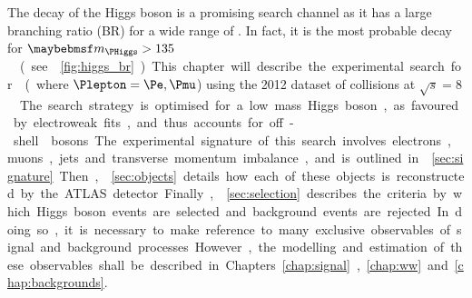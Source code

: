 
The \WW decay of the Higgs boson is a promising search channel as it has a large branching 
ratio (BR) for a wide range of \mH. In fact, it is the most probable decay for 
\unit{$\mH > 135$}{\GeV} (see \Figure~\ref{fig:higgs_br}). This chapter will describe the 
experimental search for \ggHWWlvlv (where $\Plepton = \Pe, \Pmu$) using the 2012 dataset 
of \pp collisions at \unit{$\sqrt{s} = 8$}{\TeV}. The search strategy is optimised for a 
low mass Higgs boson, as favoured by electroweak fits, and thus accounts for off-shell \PW 
bosons.

The experimental signature of this search involves electrons, muons, jets and transverse 
momentum imbalance, and is 
outlined in \Section~\ref{sec:signature}. Then, \Section~\ref{sec:objects} details how 
each of these objects is reconstructed by the ATLAS detector. Finally, 
\Section~\ref{sec:selection} describes the criteria by which Higgs boson events are 
selected and background events are rejected. In doing so, it is necessary to make 
reference to many exclusive observables of signal and background processes. However, 
the modelling and estimation of these observables shall be described in 
Chapters~\ref{chap:signal}, \ref{chap:ww} and \ref{chap:backgrounds}.
